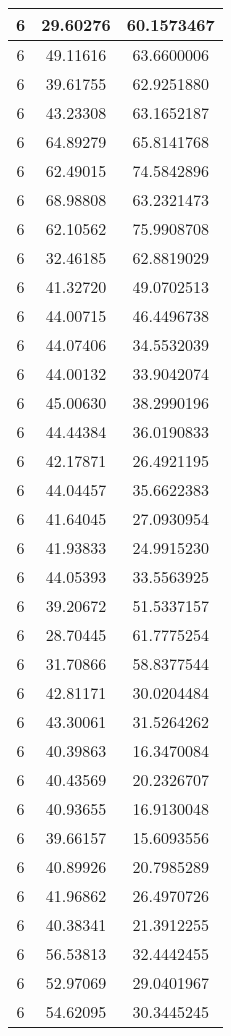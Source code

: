 \documentclass[
]{book}
\begin{document}
\begin{tabular}{c|c|c}
\hline
6 & 29.60276 & 60.1573467\\
\hline
6 & 49.11616 & 63.6600006\\
\hline
6 & 39.61755 & 62.9251880\\
\hline
6 & 43.23308 & 63.1652187\\
\hline
6 & 64.89279 & 65.8141768\\
\hline
6 & 62.49015 & 74.5842896\\
\hline
6 & 68.98808 & 63.2321473\\
\hline
6 & 62.10562 & 75.9908708\\
\hline
6 & 32.46185 & 62.8819029\\
\hline
6 & 41.32720 & 49.0702513\\
\hline
6 & 44.00715 & 46.4496738\\
\hline
6 & 44.07406 & 34.5532039\\
\hline
6 & 44.00132 & 33.9042074\\
\hline
6 & 45.00630 & 38.2990196\\
\hline
6 & 44.44384 & 36.0190833\\
\hline
6 & 42.17871 & 26.4921195\\
\hline
6 & 44.04457 & 35.6622383\\
\hline
6 & 41.64045 & 27.0930954\\
\hline
6 & 41.93833 & 24.9915230\\
\hline
6 & 44.05393 & 33.5563925\\
\hline
6 & 39.20672 & 51.5337157\\
\hline
6 & 28.70445 & 61.7775254\\
\hline
6 & 31.70866 & 58.8377544\\
\hline
6 & 42.81171 & 30.0204484\\
\hline
6 & 43.30061 & 31.5264262\\
\hline
6 & 40.39863 & 16.3470084\\
\hline
6 & 40.43569 & 20.2326707\\
\hline
6 & 40.93655 & 16.9130048\\
\hline
6 & 39.66157 & 15.6093556\\
\hline
6 & 40.89926 & 20.7985289\\
\hline
6 & 41.96862 & 26.4970726\\
\hline
6 & 40.38341 & 21.3912255\\
\hline
6 & 56.53813 & 32.4442455\\
\hline
6 & 52.97069 & 29.0401967\\
\hline
6 & 54.62095 & 30.3445245\\

\end{tabular}
\end{document}
